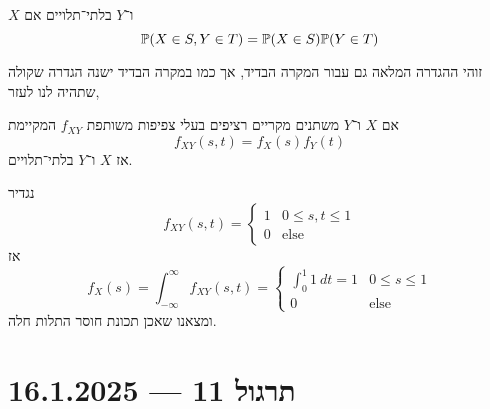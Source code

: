 \begin{definition}
	$X$ ו־$Y$ בלתי־תלויים אם
	\[
		\mathbb{P}(X \in S, Y \in T) = \mathbb{P}(X \in S) \mathbb{P}(Y \in T)
	\]
\end{definition}
זוהי ההגדרה המלאה גם עבור המקרה הבדיד, אך כמו במקרה הבדיד ישנה הגדרה שקולה שתהיה לנו לעזר,
\begin{definition}
	אם $X$ ו־$Y$ משתנים מקריים רציפים בעלי צפיפות משותפת $f_{X Y}$ המקיימת
	\[
		f_{X Y}(s, t) = f_X(s) f_Y(t)
	\]
	אז $X$ ו־$Y$ בלתי־תלויים.
\end{definition}
\begin{example}
	נגדיר
	\[
		f_{X Y}(s, t)
		= \begin{cases}
			1 & 0 \le s, t \le 1 \\
			0 & \text{else}
		\end{cases}
	\]
	אז
	\[
		f_X(s)
		= \int_{-\infty}^{\infty} f_{X Y}(s, t)
		= \begin{cases}
			\int_{0}^{1} 1\ dt = 1 & 0 \le s \le 1 \\
			0 & \text{else}
		\end{cases}
	\]
	ומצאנו שאכן תכונת חוסר התלות חלה.
\end{example}

\section{תרגול 11 --- 16.1.2025}

